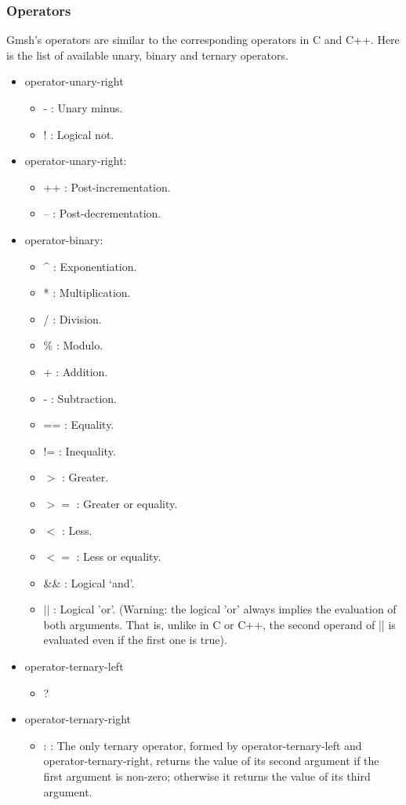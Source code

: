 \documentclass[dvipdfmx, 9pt, a4paper]{article}
\numberwithin{equation}{section}
\begin{document}
\subsubsection{Operators}
Gmsh's operators are similar to the corresponding operators in C and C++. Here is the list of available unary, binary and ternary operators.
\begin{itemize}
\item operator-unary-right
\begin{itemize}
\item - : Unary minus.
\item ! : Logical not.
\end{itemize}
\item operator-unary-right:
\begin{itemize}
\item ++ : Post-incrementation.
\item -- : Post-decrementation.
\end{itemize}
\item  operator-binary:
\begin{itemize}
\item \^{} : Exponentiation.
\item * : Multiplication.
\item / : Division.
\item \% : Modulo.
\item + : Addition.
\item - : Subtraction.
\item == : Equality.
\item != : Inequality.
\item $>$ : Greater.
\item $>=$ : Greater or equality.
\item $<$ : Less.
\item $<=$ : Less or equality.
\item \&\& : Logical ‘and’.
\item $||$ : Logical 'or'. (Warning: the logical 'or' always implies the evaluation of both arguments. That is, unlike in C or C++, the second operand of || is evaluated even if the first one is true).
\end{itemize}
\item operator-ternary-left
\begin{itemize}
\item ?
\end{itemize}
\item operator-ternary-right
\begin{itemize}
\item : : The only ternary operator, formed by operator-ternary-left and operator-ternary-right, returns the value of its second argument if the first argument is non-zero; otherwise it returns the value of its third argument.
\end{itemize}
\end{itemize}
\end{document}
